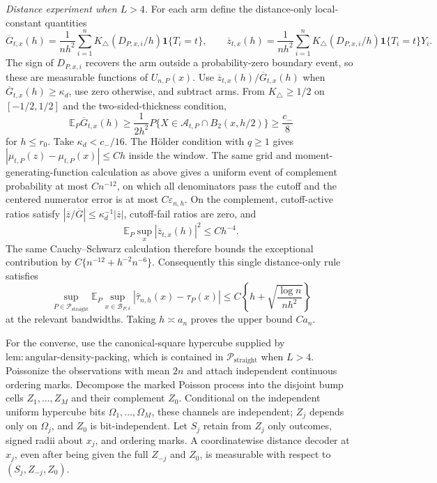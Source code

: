 \emph{Distance experiment when \(L>4\).}
For each arm define the distance-only local-constant quantities
\[
 \overline G_{t,x}(h)=\frac1{nh^2}\sum_{i=1}^n
 K_\triangle(D_{P,x,i}/h)\mathbf 1\{T_i=t\},
 \qquad
 \overline z_{t,x}(h)=\frac1{nh^2}\sum_{i=1}^n
 K_\triangle(D_{P,x,i}/h)\mathbf 1\{T_i=t\}Y_i.
\]
The sign of \(D_{P,x,i}\) recovers the arm outside a probability-zero boundary event, so these are measurable functions of \(U_{n,P}(x)\).  Use \(\overline z_{t,x}(h)/\overline G_{t,x}(h)\) when \(\overline G_{t,x}(h)\geq\kappa_d\), use zero otherwise, and subtract arms.  From \(K_\triangle\geq1/2\) on \([-1/2,1/2]\) and the two-sided-thickness condition,
\[
 \mathbb E_P\overline G_{t,x}(h)
 \geq\frac1{2h^2}P\{X\in\mathcal A_{t,P}\cap B_2(x,h/2)\}
 \geq\frac{c_-}{8}
\]
for \(h\leq r_0\).  Take \(\kappa_d<c_-/16\).  The H\"older condition with \(q\geq1\) gives \(|\mu_{t,P}(z)-\mu_{t,P}(x)|\leq Ch\) inside the window.  The same grid and moment-generating-function calculation as above gives a uniform event of complement probability at most \(Cn^{-12}\), on which all denominators pass the cutoff and the centered numerator error is at most \(C\varepsilon_{n,h}\).  On the complement, cutoff-active ratios satisfy \(|\overline z/\overline G|\leq\kappa_d^{-1}|\overline z|\), cutoff-fail ratios are zero, and
\[
 \mathbb E_P\sup_x|\overline z_{t,x}(h)|^2\leq Ch^{-4}.
\]
The same Cauchy--Schwarz calculation therefore bounds the exceptional contribution by \(C\{n^{-12}+h^{-2}n^{-6}\}\).  Consequently this single distance-only rule satisfies
\[
 \sup_{P\in\mathcal P_{\mathrm{straight}}}
 \mathbb E_P\sup_{x\in\mathcal B_{P,\delta}}
 |\widehat\tau_{n,h}(x)-\tau_P(x)|
 \leq C\left\{h+\sqrt{\frac{\log n}{nh^2}}\right\}
\]
at the relevant bandwidths.  Taking \(h\asymp a_n\) proves the upper bound \(Ca_n\).

For the converse, use the canonical-square hypercube supplied by \(\mathrm{lem:angular\text{-}density\text{-}packing}\), which is contained in \(\mathcal P_{\mathrm{straight}}\) when \(L>4\).  Poissonize the observations with mean \(2n\) and attach independent continuous ordering marks.  Decompose the marked Poisson process into the disjoint bump cells \(Z_1,\ldots,Z_M\) and their complement \(Z_0\).  Conditional on the independent uniform hypercube bits \(\Omega_1,\ldots,\Omega_M\), these channels are independent; \(Z_j\) depends only on \(\Omega_j\), and \(Z_0\) is bit-independent.  Let \(S_j\) retain from \(Z_j\) only outcomes, signed radii about \(x_j\), and ordering marks.  A coordinatewise distance decoder at \(x_j\), even after being given the full \(Z_{-j}\) and \(Z_0\), is measurable with respect to \((S_j,Z_{-j},Z_0)\).

